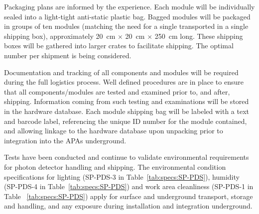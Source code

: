 Packaging plans are informed by the  experience.  Each  module will be individually sealed into a light-tight anti-static plastic bag.  Bagged modules will be packaged in groups of ten modules (matching the need for a single  transported in a single shipping box), approximately \SI{20}{cm} $\times$ \SI{20}{cm} $\times$ \SI{250}{cm} long.  These shipping boxes will be gathered into larger crates to facilitate shipping.  The optimal number per shipment is being considered.

Documentation and tracking of all components and  modules will be required during the full logistics process. Well defined procedures are in place to ensure that all components/modules are tested and examined prior to, and after, shipping. Information coming from such testing and examinations will be stored in the  hardware database.  Each  module shipping bag will be labeled with a text and barcode label, referencing the unique ID number for the module contained, and allowing linkage to the hardware database upon unpacking prior to integration into the APAs underground.

Tests have been conducted and continue to validate environmental requirements for photon detector handling and shipping. The environmental condition specifications for lighting (SP-PDS-3 in Table~\ref{tab:specs:SP-PDS}), humidity (SP-PDS-4 in Table~\ref{tab:specs:SP-PDS}) and work area cleanliness (SP-PDS-1 in Table ~\ref{tab:specs:SP-PDS})
apply for surface and underground transport, storage and handling, and any exposure during installation and integration underground. 





